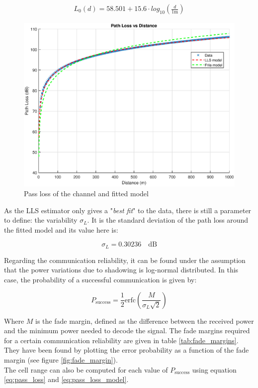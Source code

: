 \documentclass[10pt,a4paper]{ULBreport}
\begin{document}
\begin{align}
    \label{eq:pass_loss_model}
    L_0(d) = 58.501 + 15.6 \cdot log_{10} \left(\frac{d}{1\text{m}}\right)
\end{align}

\begin{figure}[H]
    \centering
    \includegraphics[width=1\textwidth]{3_5_model.eps}
    \caption{Pass loss of the channel and fitted model}
    \label{fig:pass_loss}
\end{figure}

As the LLS estimator only gives a "\textit{best fit}" to the data, there is still a parameter to define: the variability $\sigma_L$. It is the standard deviation of the path loss around the fitted model and its value here is:

\begin{equation*}
    \sigma_L = 0.30236 \quad \text{dB}
\end{equation*}

Regarding the communication reliability, it can be found under the assumption that the power variations due to shadowing is log-normal distributed. In this case, the probability of a successful communication is given by:

\begin{equation}
    \label{eq:pass_loss_probability}
    P_{\text{success}} = \frac{1}{2} \text{erfc}\left(\frac{M}{\sigma_L\sqrt{2}}\right) 
\end{equation}

Where $M$ is the fade margin, defined as the difference between the received power and the minimum power needed to decode the signal. The fade margins required for a certain communication reliability are given in table \ref{tab:fade_margins}. They have been found by plotting the error probability as a function of the fade margin (see figure \ref{fig:fade_margin}). \\
The cell range can also be computed for each value of $P_{\text{success}}$ using equation \ref{eq:pass_loss} and \ref{eq:pass_loss_model}. 
\end{document}
